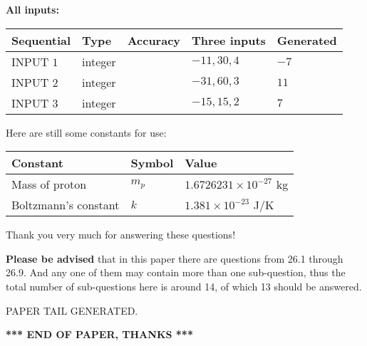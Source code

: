 \documentclass[12pt]{article}
\begin{document}
   
   
   
\noindent\vspace{0.1in}\hspace{-0.08in} {\textbf{\Large{All inputs: }}}
   
   
  
  
\noindent\begin{tabular}{|l|l|l|l|l|}
\hline
 Sequential & Type & Accuracy & Three inputs & Generated \\ 
\hline
 
 
  INPUT $           1$ & integer &  & $
 -11
 , 
 30
 , 
 4
 $ & $ -7 $ 
 \\  \hline  
 
 
  INPUT $           2$ & integer &  & $
 -31
 , 
 60
 , 
 3
 $ & $ 11 $ 
 \\  \hline  
 
 
  INPUT $           3$ & integer &  & $
 -15
 , 
 15
 , 
 2
 $ & $ 7 $ 
 \\  \hline  
 \end{tabular}
   
   
   
   
   
   
 \vspace{0.2in}
Here are still some constants for use:
 
 
\noindent\begin{tabular}{|l|l|l|}
\hline
Constant & Symbol & Value \\
\hline
 
Mass of proton &
$m_p$ &
 $ 1.6726231 \times 10^{-27} $
kg \\
\hline
 
Boltzmann's constant &
$k$ &
 $ 1.381 \times 10^{-23} $
J/K \\
\hline
 
\end{tabular}
 
Thank you very much for answering these questions!
 
{\textbf{\large{Please be advised}}} that in this paper there are questions from
26.1 through
26.9.
And any one of them may contain more than one sub-question, thus the total number
of sub-questions here is around 14, of which
13 should be answered.
 
   
   
\vspace{2.0in} PAPER TAIL GENERATED.
   
   
   
   
\vspace{1.0in} 
{\textbf{\large{ *** END OF PAPER, THANKS *** }}} 
   
\end{document}

